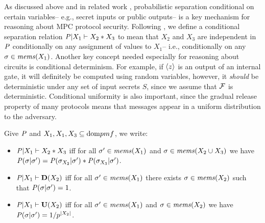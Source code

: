 As discussed above and in related work \cite{8429300}, probabilistic
separation conditional on certain variables-- e.g., secret inputs or
public outputs-- is a key mechanism for reasoning about MPC protocol
security. Following \cite{barthe2019probabilistic}, we define a
conditional separation relation $\mathit{P}|X_1 \vdash X_2 * X_3$ to
mean that $X_2$ and $X_3$ are independent in $\mathit{P}$ conditionally on
any assignment of values to $X_1$-- i.e., conditionally on any $\sigma
\in \mathit{mems}(X_1)$. Another key concept needed especially for reasoning
about circuits is conditional determinism. For example, if $\langle z \rangle$
is an output of an internal gate, it will definitely be computed using
random variables, however, it \emph{should} be deterministic under any
set of input secrets $S$, since we assume that $\mathcal{F}$ is
deterministic. Conditional uniformity is also important, since the
gradual release property of many protocols means that messages appear
in a uniform distribution to the adversary.
\begin{definition} 
  Give $\mathit{P}$ and $X_1,X_1,X_3 \subseteq \mathrm{dom}{pmf}$, 
  we write:
  \begin{itemize}
  \item $\mathit{P}|X_1 \vdash X_2 * X_3$ iff for all
    $\sigma' \in \mathit{mems}(X_1)$ and $\sigma \in \mathit{mems}(X_2 \cup X_3)$ we have
    $\mathit{P}(\sigma|\sigma') = \mathit{P}(\sigma_{X_2}|\sigma') *  \mathit{P}(\sigma_{X_3}|\sigma')$.
  \item $\mathit{P}|X_1 \vdash \mathbf{D}(X_2)$ iff for all
    $\sigma' \in \mathit{mems}(X_1)$ there exists 
    $\sigma \in \mathit{mems}(X_2)$ such that $\mathit{P}(\sigma|\sigma') = 1$.
  \item $\mathit{P}|X_1 \vdash \mathbf{U}(X_2)$ iff for all
    $\sigma' \in \mathit{mems}(X_1)$ and
    $\sigma \in \mathit{mems}(X_2)$ we have
    $\mathit{P}(\sigma|\sigma') = 1/p^{|X_2|}$.
  \end{itemize}
\end{definition}

